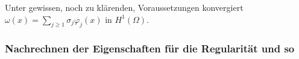 \begin{Lemma}
    Unter gewissen, noch zu klärenden, Voraussetzungen konvergiert $\omega(x) = \sum_{j \geq 1} \sigma_{j} \varphi_{j}(x)$ in $H^{1}(\Omega)$.

    \begin{Beweis}

    \end{Beweis}
\end{Lemma}



\subsubsection{Nachrechnen der Eigenschaften für die Regularität und so} %
\label{ssub:nachrechnen_von_thref_thm_kunoth_assumption2}


